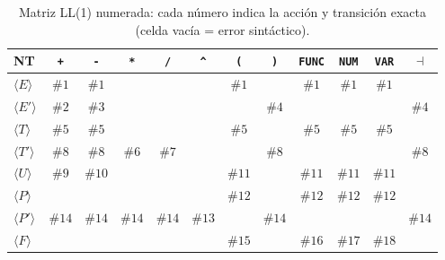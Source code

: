 \documentclass[10pt,a4paper]{article}
\begin{document}
\begin{table}[H]
\centering
\scriptsize
\begin{tabular}{lccccccccccc}
\toprule
\textbf{NT} & \texttt{+} & \texttt{-} & \texttt{*} & \texttt{/} & \texttt{\^{}} & \texttt{(} & \texttt{)} & \texttt{FUNC} & \texttt{NUM} & \texttt{VAR} & $\dashv$ \\
\midrule
$\langle E\rangle$  & $\#1$ & $\#1$ & & & & $\#1$ & & $\#1$ & $\#1$ & $\#1$ & \\
$\langle E'\rangle$ & $\#2$ & $\#3$ & & & & & $\#4$ & & & & $\#4$ \\
$\langle T\rangle$  & $\#5$ & $\#5$ & & & & $\#5$ & & $\#5$ & $\#5$ & $\#5$ & \\
$\langle T'\rangle$ & $\#8$ & $\#8$ & $\#6$ & $\#7$ & & & $\#8$ & & & & $\#8$ \\
$\langle U\rangle$  & $\#9$ & $\#10$ & & & & $\#11$ & & $\#11$ & $\#11$ & $\#11$ & \\
$\langle P\rangle$  & & & & & & $\#12$ & & $\#12$ & $\#12$ & $\#12$ & \\
$\langle P'\rangle$ & $\#14$ & $\#14$ & $\#14$ & $\#14$ & $\#13$ & & $\#14$ & & & & $\#14$ \\
$\langle F\rangle$  & & & & & & $\#15$ & & $\#16$ & $\#17$ & $\#18$ & \\
\bottomrule
\end{tabular}
\caption{Matriz LL(1) numerada: cada número indica la acción y transición exacta (celda vacía = error sintáctico).}
\end{table}
\end{document}
